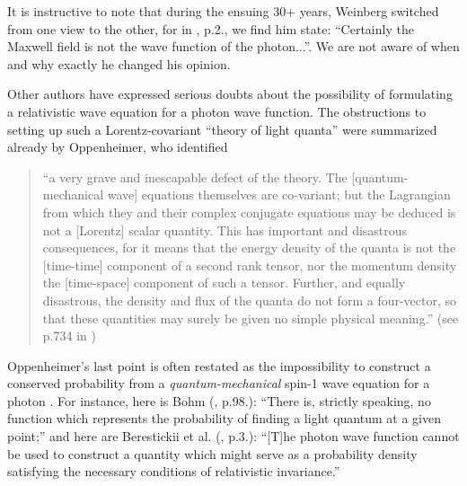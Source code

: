 \documentclass[12pt]{article}
\theoremstyle{definition}
\numberwithin{equation}{section}
\begin{document}
 It is instructive to note that during the ensuing 30+ years, Weinberg switched from one view to the other, for
in \cite{WeinbergTALK}, p.2., we find him state: ``Certainly the Maxwell field is not the wave function of the photon...''.
 We are not aware of when and why exactly he changed his opinion.

 Other authors have expressed serious doubts about the possibility of formulating a relativistic wave equation for a photon wave function.
 The obstructions to setting up such a Lorentz-covariant ``theory of light quanta'' were summarized already by 
Oppenheimer, who identified \vspace{-5pt}
\begin{quotation}
\noindent
``a very grave and inescapable defect of the theory. The [quantum-mechanical wave] equations themselves are co-variant; 
but the Lagrangian from which they and their complex conjugate equations may be deduced is not a [Lorentz] scalar quantity. 
 This has important and disastrous consequences, for it means that the energy density of the quanta is not the [time-time]
component of a second rank tensor, nor the momentum density the [time-space] component of such a tensor.
 Further, and equally disastrous, the density and flux of the quanta do not form a four-vector, so that these quantities
 may surely be given no simple physical meaning.'' (see p.734 in \cite{OppiPHOTON}) 
\end{quotation}

\noindent
 Oppenheimer's last point is often restated as the impossibility to construct a conserved
probability from a  \emph{quantum-mechanical} spin-1 wave equation for a photon
\cite{LandauLifshitzBOOKrelQM,BohmBOOKonQM,WeinbergBOOKqft}.
 For instance, here is Bohm (\cite{BohmBOOKonQM}, p.98.): ``There is, strictly speaking, no function which represents the  
probability of finding a light quantum at a given point;'' and here are Berestickii et al.
(\cite{LandauLifshitzBOOKrelQM}, p.3.): 
``[T]he photon wave function cannot be used to construct a quantity which might serve as a probability density
satisfying the necessary conditions of relativistic invariance.'' 

\end{document}

